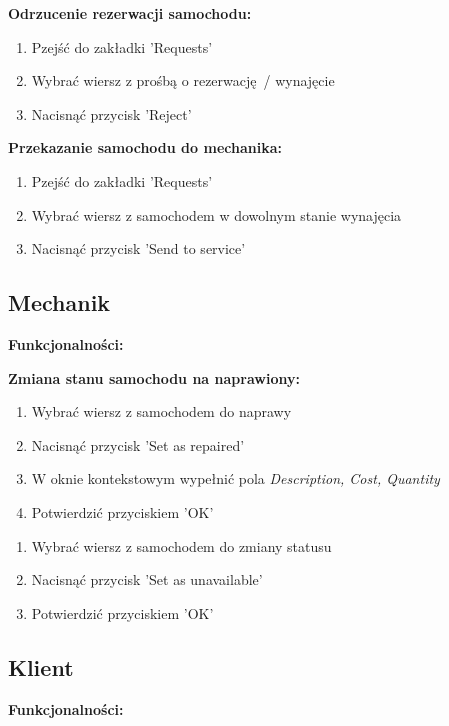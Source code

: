 \documentclass{article}
\begin{document}
\textbf{Odrzucenie rezerwacji samochodu:}

\begin{enumerate}
    \item Pzejść do zakładki 'Requests'
    \item Wybrać wiersz z prośbą o rezerwację / wynajęcie
    \item Nacisnąć przycisk 'Reject'
\end{enumerate}

\textbf{Przekazanie samochodu do mechanika:}

\begin{enumerate}
    \item Pzejść do zakładki 'Requests'
    \item Wybrać wiersz z samochodem w dowolnym stanie wynajęcia
    \item Nacisnąć przycisk 'Send to service'
\end{enumerate}

\subsection{Mechanik}

\textbf{Funkcjonalności:}
\vspace{1em}

\textbf{Zmiana stanu samochodu na naprawiony:}

\begin{enumerate}
    \item Wybrać wiersz z samochodem do naprawy
    \item Nacisnąć przycisk 'Set as repaired'
    \item W oknie kontekstowym wypełnić pola \textit{Description, Cost, Quantity}
    \item Potwierdzić przyciskiem 'OK'
\end{enumerate}

\begin{enumerate}
    \item Wybrać wiersz z samochodem do zmiany statusu
    \item Nacisnąć przycisk 'Set as unavailable'
    \item Potwierdzić przyciskiem 'OK'
\end{enumerate}

\subsection{Klient}
\textbf{Funkcjonalności:}
\vspace{1em}
\end{document}
